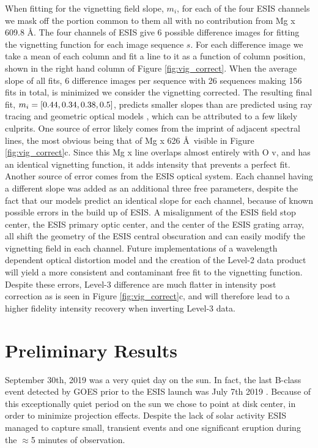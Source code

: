         When fitting for the vignetting field slope, $m_i$, for each  of the four ESIS channels we mask off the portion common to them all with no contribution from Mg {\sc x} 609.8 \AA.
        The four channels of ESIS give 6 possible difference images for fitting the vignetting function for each image sequence $s$. 
        For each difference image we take a mean of each column and fit a line to it as a function of column position, shown in the right hand column of Figure \ref{fig:vig_correct}.
        When the average slope of all fits, 6 difference images per sequence with 26 sequences making 156 fits in total, is minimized we consider the vignetting corrected.
        The resulting final fit, $m_i = [0.44, 0.34, 0.38, 0.5]$, predicts smaller slopes than are predicted using ray tracing and geometric optical models \citep{ESIS}, which can be attributed to a few likely culprits.
        One source of error likely comes from the imprint of adjacent spectral lines, the most obvious being that of Mg {\sc x} 626 \AA \ visible in Figure \ref{fig:vig_correct}c.
        Since this Mg {\sc x} line overlaps almost entirely with O {\sc v}, and has an identical vignetting function, it adds intensity that prevents a perfect fit.
        Another source of error comes from the ESIS optical system.
        Each channel having a different slope was added as an additional three free parameters, despite the fact that our models predict an identical slope for each channel, because of known possible errors in the build up of ESIS.
        A misalignment of the ESIS field stop center, the ESIS primary optic center, and the center of the ESIS grating array, all shift the geometry of the ESIS central obscuration and can easily modify the vignetting field in each channel.
        Future implementations of a wavelength dependent optical distortion model and the creation of the Level-2 data product will yield a more consistent and contaminant free fit to the vignetting function.
        Despite these errors, Level-3 difference are much flatter in intensity post correction as is seen in Figure \ref{fig:vig_correct}c, and will therefore lead to a higher fidelity intensity recovery when inverting Level-3 data.
        

  

\section{Preliminary Results}
	September 30th, 2019 was a very quiet day on the sun.  
	In fact, the last  B-class event detected by GOES \citep{GOES} prior to the ESIS launch was July 7th 2019 .  
	Because of this exceptionally quiet period on the sun we chose to point at disk center, in order to minimize projection effects.  
	Despite the lack of solar activity ESIS managed to capture  small, transient events and one significant eruption during the $\approx$5 minutes of observation.
	
